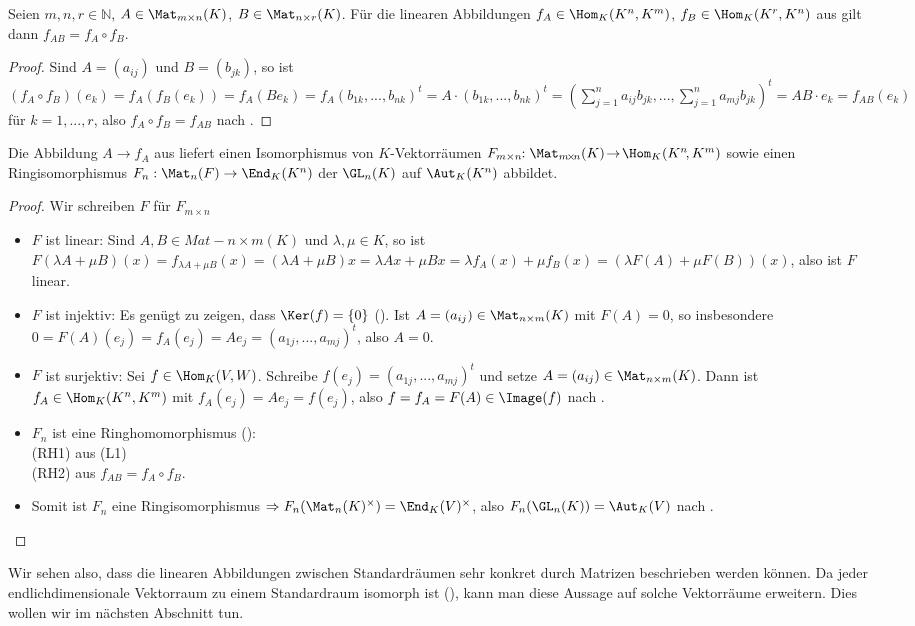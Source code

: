 \begin{lemma}
	Seien $m,n,r\in \mathbb N$, $A\in \Mat_{m\times n}(K)$, $B\in \Mat_{n\times r}(K)$. Für die linearen 
	Abbildungen $f_A\in \Hom_K(K^n,K^m)$, $f_B\in \Hom_K(K^r,K^n)$ aus  gilt dann $f_{AB}=f_A\circ f_B$.
\end{lemma}
\begin{proof}
	Sind $A=(a_{ij})$ und $B=(b_{jk})$, so ist $(f_A\circ f_B)(e_k)=f_A(f_B(e_k))=f_A(Be_k)=f_A(b_{1k},...,b_{nk})^t=
	A\cdot (b_{1k},...,b_{nk})^t=(\sum_{j=1}^n a_{ij}b_{jk},...,\sum_{j=1}^n a_{mj}b_{jk})^t=AB\cdot e_k=
	f_{AB}(e_k)$ für $k=1,...,r$, also $f_A\circ f_B=f_{AB}$ nach .
\end{proof}

\begin{proposition}
	Die Abbildung $A\to f_A$ aus  liefert einen Isomorphismus von $K$-Vektorräumen $F_{m\times n}\!\!: \Mat_{m\!\times\!n}(K)
	\!\to\! \Hom_K(K^n\!,K^m)$ sowie einen Ringisomorphismus $F_n:\Mat_n(F)\to \End_K(K^n)$ der $\GL_n(K)$ auf $\Aut_K(K^n)$ 
	abbildet.
\end{proposition}
\begin{proof}
	Wir schreiben $F$ für $F_{m\times n}$
	\begin{itemize}
		\item $F$ ist linear: Sind $A,B\in Mat-{n\times m}(K)$ und $\lambda,\mu\in K$, so ist $F(\lambda A+\mu B)(x)=
		f_{\lambda A+\mu B}(x)=(\lambda A+\mu B)x=\lambda Ax+\mu Bx=\lambda f_A(x)+\mu f_B(x)=(\lambda F(A)+\mu F(B))(x)$, 
		also ist $F$ linear.
		\item $F$ ist injektiv: Es genügt zu zeigen, dass $\Ker(f)=\{0\}$ (). Ist $A=(a_{ij})\in \Mat_{n\times m}(K)$ mit $F(A)=0$, 
		so insbesondere $0=F(A)(e_j)=f_A(e_j)=Ae_j=(a_{1j},...,a_{mj})^t$, also $A=0$.
		\item $F$ ist surjektiv: Sei $f\in \Hom_K(V,W)$. Schreibe $f(e_j)=(a_{1j},...,a_{mj})^t$ und setze $A=(a_{ij})\in 
		\Mat_{n\times m}(K)$. Dann ist $f_A\in \Hom_K(K^n,K^m)$ mit $f_A(e_j)=Ae_j=f(e_j)$, also $f=f_A=F(A)\in \Image(f)$ nach .
		\item $F_n$ ist eine Ringhomomorphismus (): \\
		(RH1) aus (L1) \\
		(RH2) aus $f_{AB}=f_A\circ f_B$.
		\item Somit ist $F_n$ eine Ringisomorphismus $\Rightarrow F_n(\Mat_n(K)^{\times})=\End_K(V)^{\times}$, also $F_n(
		\GL_n(K))=\Aut_K(V)$ nach .
	\end{itemize}
\end{proof}

\begin{remark}
	Wir sehen also, dass die linearen Abbildungen zwischen Standardräumen sehr konkret durch Matrizen beschrieben werden können. Da jeder endlichdimensionale Vektorraum zu einem Standardraum isomorph ist (), kann man diese Aussage auf solche Vektorräume erweitern. Dies wollen wir im nächsten Abschnitt tun.
\end{remark}